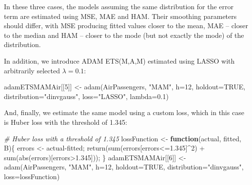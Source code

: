 \documentclass[
]{book}
\newenvironment{Shaded}{\begin{snugshade}}{\end{snugshade}}
\newcommand{\AttributeTok}[1]{\textcolor[rgb]{0.77,0.63,0.00}{#1}}
\newcommand{\CommentTok}[1]{\textcolor[rgb]{0.56,0.35,0.01}{\textit{#1}}}
\newcommand{\ConstantTok}[1]{\textcolor[rgb]{0.00,0.00,0.00}{#1}}
\newcommand{\ControlFlowTok}[1]{\textcolor[rgb]{0.13,0.29,0.53}{\textbf{#1}}}
\newcommand{\DecValTok}[1]{\textcolor[rgb]{0.00,0.00,0.81}{#1}}
\newcommand{\FloatTok}[1]{\textcolor[rgb]{0.00,0.00,0.81}{#1}}
\newcommand{\FunctionTok}[1]{\textcolor[rgb]{0.00,0.00,0.00}{#1}}
\newcommand{\NormalTok}[1]{#1}
\newcommand{\OtherTok}[1]{\textcolor[rgb]{0.56,0.35,0.01}{#1}}
\newcommand{\SpecialCharTok}[1]{\textcolor[rgb]{0.00,0.00,0.00}{#1}}
\newcommand{\StringTok}[1]{\textcolor[rgb]{0.31,0.60,0.02}{#1}}
\theoremstyle{definition}
\theoremstyle{definition}
\theoremstyle{definition}
\theoremstyle{definition}
\theoremstyle{remark}
\begin{document}
In these three cases, the models assuming the same distribution for the error term are estimated using MSE, MAE and HAM. Their smoothing parameters should differ, with MSE producing fitted values closer to the mean, MAE -- closer to the median and HAM -- closer to the mode (but not exactly the mode) of the distribution.

In addition, we introduce ADAM ETS(M,A,M) estimated using LASSO with arbitrarily selected \(\lambda=0.1\):

\begin{Shaded}
\begin{Highlighting}[]
\NormalTok{adamETSMAMAir[[}\DecValTok{5}\NormalTok{]] }\OtherTok{\textless{}{-}} \FunctionTok{adam}\NormalTok{(AirPassengers, }\StringTok{"MAM"}\NormalTok{, }\AttributeTok{h=}\DecValTok{12}\NormalTok{, }\AttributeTok{holdout=}\ConstantTok{TRUE}\NormalTok{,}
                           \AttributeTok{distribution=}\StringTok{"dinvgauss"}\NormalTok{,}
                           \AttributeTok{loss=}\StringTok{"LASSO"}\NormalTok{, }\AttributeTok{lambda=}\FloatTok{0.1}\NormalTok{)}
\end{Highlighting}
\end{Shaded}

And, finally, we estimate the same model using a custom loss, which in this case is Huber loss \citep{Huber1992} with the threshold of 1.345:

\begin{Shaded}
\begin{Highlighting}[]
\CommentTok{\# Huber loss with a threshold of 1.345}
\NormalTok{lossFunction }\OtherTok{\textless{}{-}} \ControlFlowTok{function}\NormalTok{(actual, fitted, B)\{}
\NormalTok{    errors }\OtherTok{\textless{}{-}}\NormalTok{ actual}\SpecialCharTok{{-}}\NormalTok{fitted;}
    \FunctionTok{return}\NormalTok{(}\FunctionTok{sum}\NormalTok{(errors[errors}\SpecialCharTok{\textless{}=}\FloatTok{1.345}\NormalTok{]}\SpecialCharTok{\^{}}\DecValTok{2}\NormalTok{) }\SpecialCharTok{+}
               \FunctionTok{sum}\NormalTok{(}\FunctionTok{abs}\NormalTok{(errors)[errors}\SpecialCharTok{\textgreater{}}\FloatTok{1.345}\NormalTok{]));}
\NormalTok{\}}
\NormalTok{adamETSMAMAir[[}\DecValTok{6}\NormalTok{]] }\OtherTok{\textless{}{-}} \FunctionTok{adam}\NormalTok{(AirPassengers, }\StringTok{"MAM"}\NormalTok{, }\AttributeTok{h=}\DecValTok{12}\NormalTok{, }\AttributeTok{holdout=}\ConstantTok{TRUE}\NormalTok{,}
                           \AttributeTok{distribution=}\StringTok{"dinvgauss"}\NormalTok{,}
                           \AttributeTok{loss=}\NormalTok{lossFunction)}
\end{Highlighting}
\end{Shaded}
\end{document}
